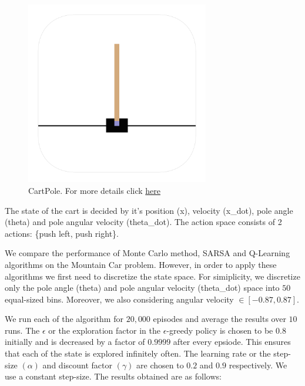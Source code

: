 \documentclass{article}
\begin{document}
\begin{figure}[H]
    \graphicspath{ {../tmp/} }
    \begin{center}
    \includegraphics[width=8cm]{cartpole.png}
    \end{center}
    \caption{CartPole. For more details click \href{https://gym.openai.com/envs/CartPole-v1/}{here} }
    \label{policy_iter_jack_problem}
\end{figure}

\noindent %
The state of the cart is decided by it's position (x), velocity (x\_dot), pole angle (theta) and pole angular velocity (theta\_dot). The action space
consists of 2 actions: \{push left, push right\}.\par

\noindent %
We compare the performance of Monte Carlo method, SARSA and Q-Learning algorithms on the Mountain Car problem. However, in order to
apply these algorithms we first need to discretize the state space. For simiplicity, we discretize only the pole angle (theta) and pole angular velocity
(theta\_dot) space into $50$ equal-sized bins. Moreover, we also considering angular velocity $\in [-0.87, 0.87]$.\par

\noindent %
We run each of the algorithm for $20,000$ episodes and average the results over $10$ runs. The $\epsilon$ or the exploration factor
in the $\epsilon$-greedy policy is chosen to be $0.8$ initially and is decreased by a factor of $0.9999$ after every epsiode. This ensures
that each of the state is explored infinitely often. The learning rate or the step-size $(\alpha)$ and discount factor $(\gamma)$ are 
chosen to $0.2$ and $0.9$ respectively. We use a constant step-size. The results obtained are as follows:\par
\end{document}

